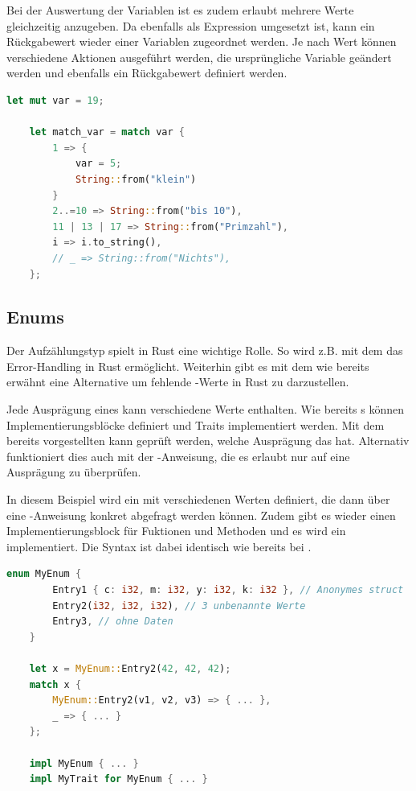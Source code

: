 \documentclass[11pt,a4paper, ngerman]{article}
\begin{document}
Bei der Auswertung der Variablen ist es zudem erlaubt mehrere Werte gleichzeitig anzugeben. Da  ebenfalls als Expression umgesetzt ist, kann ein Rückgabewert wieder einer Variablen zugeordnet werden. Je nach Wert können verschiedene Aktionen ausgeführt werden, die ursprüngliche Variable geändert werden und ebenfalls ein Rückgabewert definiert werden.

\begin{lstlisting}[language=rust, caption={match}]
    let mut var = 19;

    let match_var = match var {
        1 => {
            var = 5;
            String::from("klein")
        }
        2..=10 => String::from("bis 10"),
        11 | 13 | 17 => String::from("Primzahl"),
        i => i.to_string(),
        // _ => String::from("Nichts"),
    };
\end{lstlisting}

\subsection{Enums}
Der Aufzählungstyp  spielt in Rust eine wichtige Rolle. So wird z.B. mit dem   das Error-Handling in Rust ermöglicht. Weiterhin gibt es mit dem   wie bereits erwähnt eine Alternative um fehlende -Werte in Rust zu darzustellen.

Jede Ausprägung eines  kann verschiedene Werte enthalten. Wie bereits s können Implementierungsblöcke definiert und Traits implementiert werden. Mit dem bereits vorgestellten  kann geprüft werden, welche Ausprägung das  hat. Alternativ funktioniert dies auch mit der -Anweisung, die es erlaubt nur auf eine Ausprägung zu überprüfen.

In diesem Beispiel wird ein  mit verschiedenen Werten definiert, die dann über eine -Anweisung konkret abgefragt werden können. Zudem gibt es wieder einen Implementierungsblock für Fuktionen und Methoden und es wird ein  implementiert. Die Syntax ist dabei identisch wie bereits bei .

\begin{lstlisting}[language=rust, caption={enum}]
    enum MyEnum {
        Entry1 { c: i32, m: i32, y: i32, k: i32 }, // Anonymes struct
        Entry2(i32, i32, i32), // 3 unbenannte Werte
        Entry3, // ohne Daten
    }

    let x = MyEnum::Entry2(42, 42, 42);
    match x {
        MyEnum::Entry2(v1, v2, v3) => { ... },
        _ => { ... }
    };

    impl MyEnum { ... }
    impl MyTrait for MyEnum { ... }
\end{lstlisting}
\end{document}
